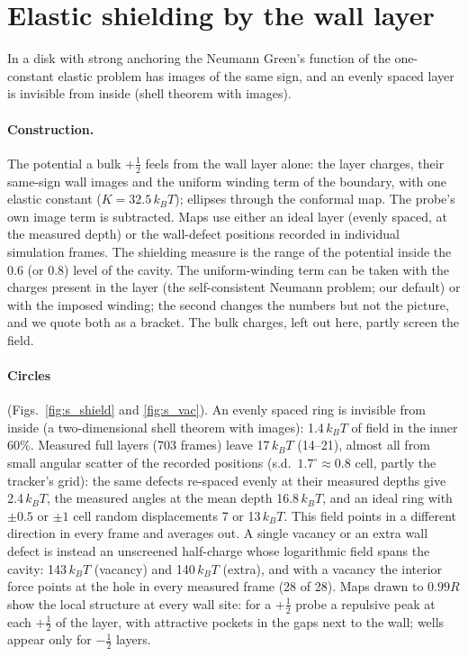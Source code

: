 \documentclass[aps,prl,onecolumn,superscriptaddress,amsmath,amssymb,nofootinbib]{revtex4-2}
\newcommand{\half}{\tfrac12}
\newcommand{\kT}{k_BT}
\begin{document}

\section{Elastic shielding by the wall layer}\label{si:shield}
In a disk with strong anchoring the Neumann Green's function of the one-constant elastic problem has images of the same sign, and an evenly spaced layer is invisible
from inside (shell theorem with images).
\paragraph{Construction.} The potential a bulk $+\half$ feels from the wall layer alone: the layer charges, their same-sign wall images and the uniform winding term of the
boundary, with one elastic constant ($K=32.5\,\kT$); ellipses through the conformal map. The probe's own image term is subtracted. Maps use either an ideal layer (evenly spaced,
at the measured depth) or the wall-defect positions recorded in individual simulation frames. The shielding measure is the range of the potential inside the 0.6 (or 0.8) level of
the cavity. The uniform-winding term can be taken with the charges present in the layer (the self-consistent Neumann problem; our default) or with the imposed winding; the second
changes the numbers but not the picture, and we quote both as a bracket. The bulk charges, left out here, partly screen the field.

\paragraph{Circles} (Figs.~\ref{fig:s_shield} and \ref{fig:s_vac}). An evenly spaced ring is invisible from inside (a two-dimensional shell theorem with images): 1.4\,$\kT$ of field in
the inner 60\%. Measured full layers (703 frames) leave 17\,$\kT$ (14--21), almost all from small angular scatter of the recorded positions (s.d.\ $1.7^\circ\approx0.8$ cell, partly the
tracker's grid): the same defects re-spaced evenly at their measured depths give 2.4\,$\kT$, the measured angles at the mean depth 16.8\,$\kT$, and an ideal ring with $\pm0.5$ or $\pm1$
cell random displacements 7 or 13\,$\kT$. This field points in a different direction in every frame and averages out. A single vacancy or an extra wall defect is instead an unscreened
half-charge whose logarithmic field spans the cavity: 143\,$\kT$ (vacancy) and 140\,$\kT$ (extra), and with a vacancy the interior force points at the hole in every measured frame
(28 of 28). Maps drawn to $0.99R$ show the local structure at every wall site: for a $+\half$ probe a repulsive peak at each $+\half$ of the layer, with attractive pockets in the gaps next to
the wall; wells appear only for $-\half$ layers.
\end{document}

